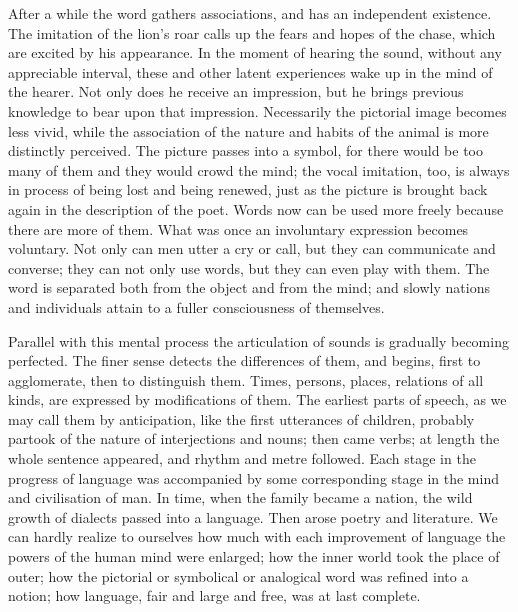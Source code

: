 \documentclass[11pt,letter]{article}
\begin{document}
\par  After a while the word gathers associations, and has an independent existence. The imitation of the lion’s roar calls up the fears and hopes of the chase, which are excited by his appearance. In the moment of hearing the sound, without any appreciable interval, these and other latent experiences wake up in the mind of the hearer. Not only does he receive an impression, but he brings previous knowledge to bear upon that impression. Necessarily the pictorial image becomes less vivid, while the association of the nature and habits of the animal is more distinctly perceived. The picture passes into a symbol, for there would be too many of them and they would crowd the mind; the vocal imitation, too, is always in process of being lost and being renewed, just as the picture is brought back again in the description of the poet. Words now can be used more freely because there are more of them. What was once an involuntary expression becomes voluntary. Not only can men utter a cry or call, but they can communicate and converse; they can not only use words, but they can even play with them. The word is separated both from the object and from the mind; and slowly nations and individuals attain to a fuller consciousness of themselves.

\par  Parallel with this mental process the articulation of sounds is gradually becoming perfected. The finer sense detects the differences of them, and begins, first to agglomerate, then to distinguish them. Times, persons, places, relations of all kinds, are expressed by modifications of them. The earliest parts of speech, as we may call them by anticipation, like the first utterances of children, probably partook of the nature of interjections and nouns; then came verbs; at length the whole sentence appeared, and rhythm and metre followed. Each stage in the progress of language was accompanied by some corresponding stage in the mind and civilisation of man. In time, when the family became a nation, the wild growth of dialects passed into a language. Then arose poetry and literature. We can hardly realize to ourselves how much with each improvement of language the powers of the human mind were enlarged; how the inner world took the place of outer; how the pictorial or symbolical or analogical word was refined into a notion; how language, fair and large and free, was at last complete.
\end{document}
